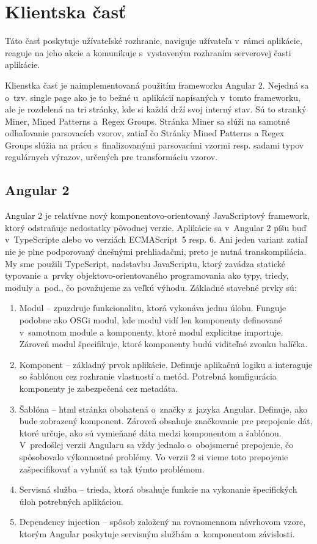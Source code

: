 \chapter{Klientska časť}
Táto časť poskytuje užívateľské rozhranie, naviguje užívateľa v~rámci aplikácie, reaguje na jeho akcie a komunikuje s~vystaveným rozhraním serverovej časti aplikácie.
\par Klienstka časť je naimplementovaná použitím frameworku Angular 2. Nejedná sa o~tzv. single page ako je to bežné u~aplikácií napísaných v~tomto frameworku, ale je rozdelená na tri stránky, kde si každá drží svoj interný stav. Sú to stranký Miner, Mined Patterns a~Regex Groups. Stránka Miner sa slúži na samotné odhaľovanie parsovacích vzorov, zatiaľ čo Stránky Mined Patterns a Regex Groups slúžia na prácu s~finalizovanými parsovacími vzormi resp. sadami typov regulárnych výrazov, určených pre transformáciu vzorov.


\section{Angular 2}
Angular 2 je relatívne nový komponentovo-orientovaný JavaScriptový framework, ktorý odstraňuje nedostatky pôvodnej verzie. Aplikácie sa v~Angular 2 píšu buď v~TypeScripte alebo vo verziách \mbox{ECMAScript}~5 resp. 6. Ani jeden variant zatiaľ nie je plne podporovaný dnešnými prehliadačmi, preto je nutná transkompilácia. My sme použili TypeScript, nadstavbu JavaScriptu, ktorý zavádza statické typovanie a~prvky objektovo-orientovaného programovania ako typy, triedy, moduly a~pod., čo považujeme za veľkú výhodu. Základné stavebné prvky sú:

\begin{enumerate}
 \item Modul -- zpuzdruje funkcionalitu, ktorá vykonáva jednu úlohu. Funguje podobne ako OSGi modul, kde modul vidí len komponenty definované v~samotnom module a komponenty, ktoré modul explicitne importuje. Zároveň modul špecifikuje, ktoré komponenty budú viditeľné zvonku balíčka.
 \item Komponent -- základný prvok aplikácie. Definuje aplikačnú logiku a interaguje so šablónou cez rozhranie vlastností a metód. Potrebná komfigurácia komponenty je zabezpečená cez metadáta.
 \item Šablóna -- html stránka obohatená o~značky z~jazyka Angular. Definuje, ako bude zobrazený komponent. Zároveň obsahuje značkovanie pre prepojenie dát, ktoré určuje, ako sú vymieňané dáta medzi komponentom a šablónou. V~predošlej verzii Angularu sa vždy jednalo o~obojsmerné prepojenie, čo spôsobovalo výkonnostné problémy. Vo verzii 2 si vieme toto prepojenie zašpecifikovať a vyhnúť sa tak týmto problémom.
 \item Servisná služba -- trieda, ktorá obsahuje funkcie na vykonanie špecifických úloh potrebných aplikáciou.
 \item Dependency injection -- spôsob založený na rovnomennom návr\-hovom vzore, ktorým Angular poskytuje servisným službám a~komponentom závislosti.
\end{enumerate}


